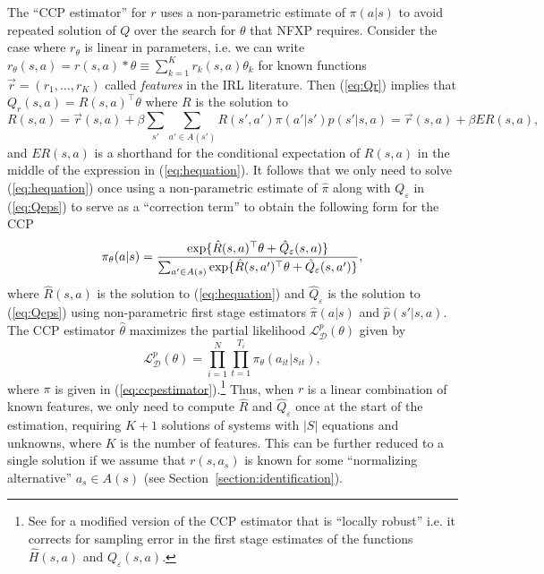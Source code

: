The ``CCP estimator'' \citep{hotzmiller:1993}
for $r$ uses a non-parametric estimate of $\pi(a|s)$ to avoid repeated
solution of $Q$ over the search for $\theta$ that NFXP requires. Consider the case where $r_\theta$ is linear in parameters,
i.e. we can write $r_\theta(s,a)=r(s,a)*\theta \equiv \sum_{k=1}^K r_k(s,a)\theta_k$ for known functions
 $\vec{r}=(r_1,\ldots,r_K)$ called {\it features\/} in the IRL
literature. Then (\ref{eq:Qr}) implies that $Q_r(s,a)=R(s,a)^{\top}\theta$ where
$R$ is the solution to
\begin{equation}
   R(s,a)=\vec{r}(s,a) + \beta \sum_{s'} \sum_{a' \in A(s')} R(s',a')\pi(a'|s')p(s'|s,a) = \vec{r}(s,a)+\beta ER(s,a),
\label{eq:hequation}
\end{equation}
and $ER(s,a)$ is a shorthand for the conditional expectation of $R(s,a)$ in the middle of the expression in (\ref{eq:hequation}).
It follows that we only need to solve (\ref{eq:hequation}) once using a non-parametric estimate of $\hat\pi$ along with
$Q_\varepsilon$ in (\ref{eq:Qeps}) to serve as a ``correction term''  to obtain the following form for the CCP
\begin{equation}  
           \pi_\theta(a|s) = {\exp\{\hat R(s,a)^{\top}\theta+\hat Q_\varepsilon(s,a)\} \over \sum_{a' \in A(s)}
\exp\{\hat R(s,a')^{\top}\theta+\hat Q_\varepsilon(s,a')\}},
\label{eq:ccpestimator}
\end{equation}
where $\hat R(s,a)$ is the solution to (\ref{eq:hequation}) and $\hat Q_\varepsilon$ is the solution
to (\ref{eq:Qeps}) using non-parametric first stage
estimators $\hat\pi(a|s)$ and $\hat p(s'|s,a)$. The CCP estimator $\hat\theta$ maximizes the partial likelihood 
$\mathcal{L}^p_{\mathcal{D}}(\theta)$ given by 
\begin{equation}
    \mathcal{L}^p_{\mathcal{D}}(\theta) = \prod_{i=1}^N \prod_{t=1}^{T_i}  \pi_\theta(a_{it}|s_{it}),
\label{eq:ccplf}
\end{equation}
where $\pi$ is given in (\ref{eq:ccpestimator}).\footnote{\footnotesize See \citet{lrspe:2022} 
for  a modified version of the CCP estimator that is ``locally robust'' i.e. it corrects for sampling
error in the first stage estimates of the functions $\hat H(s,a)$ and $Q_\varepsilon(s,a)$.}
Thus, when $r$ is a  linear combination of known features, we only  need to compute $\hat R$ and $\hat Q_\varepsilon$ once
at the start of the estimation, requiring  $K+1$ solutions of systems with $|S|$ equations and unknowns,
where $K$ is the number of features. This can be further reduced to
a single solution if we assume that $r(s,a_s)$ is known for some
``normalizing alternative'' $a_s \in A(s)$ (see Section~\ref{section:identification}).

